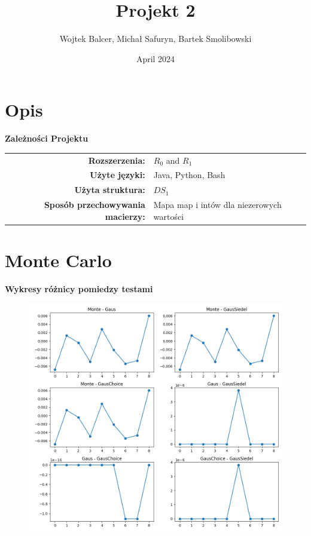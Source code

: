 \documentclass{article}
\title{Projekt 2}
\author{Wojtek Balcer, Michał Safuryn, Bartek Smolibowski}
\date{April 2024}
\begin{document}
\maketitle
\section{Opis}

\noindent
\textbf{Zależności Projektu} \\
\begin{tabular}{>{\bfseries}rl}
Rozszerzenia: & $R_0$ and $R_1$ \\
Użyte języki: & Java, Python, Bash \\
Użyta struktura: & $DS_1$ \\
Sposób przechowywania macierzy: & Mapa map i intów dla niezerowych wartości \\
\end{tabular}

\clearpage

\section{Monte Carlo}

\hspace{}

\textbf{Wykresy różnicy pomiedzy testami}

\begin{figure}[ht!]
    \centering
    \includegraphics[width=1\linewidth]{comparison_plots.png}
    \label{fig:my_label}
\end{figure}
\end{document}
